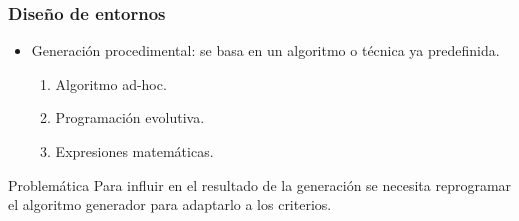 \begin{frame}
	\frametitle{Diseño de entornos}
	
	\begin{itemize}
		\item \textcolor{UDCpink}{Generación procedimental}: se basa en un algoritmo o técnica ya predefinida.
		
		\vspace{1em}
		
		\begin{enumerate}
			\item Algoritmo ad-hoc.
			
			\vspace{0.5em}
			
			\item Programación evolutiva.
			
			\vspace{0.5em}
			
			\item Expresiones matemáticas.
		\end{enumerate}
	\end{itemize}
	
	\vspace{1em}
	
	\pause
	
	\begin{block}{\normalsize Problemática}
		\vspace{1em}
		Para \textcolor{UDCpink}{influir} en el resultado de la generación se necesita \textcolor{UDCpink}{reprogramar} el algoritmo generador para adaptarlo a los criterios.
		\vspace{1em}
	\end{block}
\end{frame}

